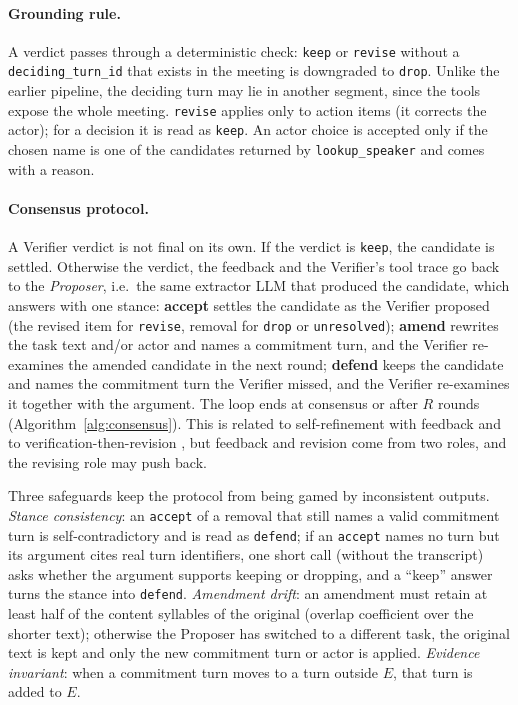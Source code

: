 \paragraph{Grounding rule.}
A verdict passes through a deterministic check: \texttt{keep} or \texttt{revise} without a \texttt{deciding\_turn\_id} that exists in the meeting is downgraded to \texttt{drop}.
Unlike the earlier pipeline, the deciding turn may lie in another segment, since the tools expose the whole meeting.
\texttt{revise} applies only to action items (it corrects the actor); for a decision it is read as \texttt{keep}.
An actor choice is accepted only if the chosen name is one of the candidates returned by \texttt{lookup\_speaker} and comes with a reason.

\paragraph{Consensus protocol.}
A Verifier verdict is not final on its own.
If the verdict is \texttt{keep}, the candidate is settled.
Otherwise the verdict, the feedback and the Verifier's tool trace go back to the \emph{Proposer}, i.e.\ the same extractor LLM that produced the candidate, which answers with one stance:
\textbf{accept} settles the candidate as the Verifier proposed (the revised item for \texttt{revise}, removal for \texttt{drop} or \texttt{unresolved});
\textbf{amend} rewrites the task text and/or actor and names a commitment turn, and the Verifier re-examines the amended candidate in the next round;
\textbf{defend} keeps the candidate and names the commitment turn the Verifier missed, and the Verifier re-examines it together with the argument.
The loop ends at consensus or after $R$ rounds (Algorithm~\ref{alg:consensus}).
This is related to self-refinement with feedback \citep{madaan2023selfrefine} and to verification-then-revision \citep{dhuliawala2024cove}, but feedback and revision come from two roles, and the revising role may push back.

Three safeguards keep the protocol from being gamed by inconsistent outputs.
\emph{Stance consistency}: an \texttt{accept} of a removal that still names a valid commitment turn is self-contradictory and is read as \texttt{defend}; if an \texttt{accept} names no turn but its argument cites real turn identifiers, one short call (without the transcript) asks whether the argument supports keeping or dropping, and a ``keep'' answer turns the stance into \texttt{defend}.
\emph{Amendment drift}: an amendment must retain at least half of the content syllables of the original (overlap coefficient over the shorter text); otherwise the Proposer has switched to a different task, the original text is kept and only the new commitment turn or actor is applied.
\emph{Evidence invariant}: when a commitment turn moves to a turn outside $E$, that turn is added to $E$.

